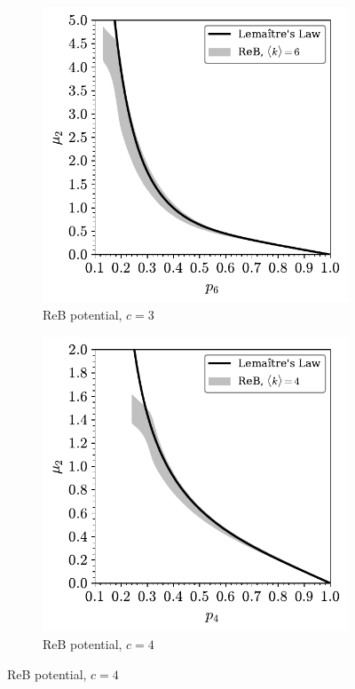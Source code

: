 \begin{figure}[bt]
     \vspace{2mm}
     \begin{subfigure}[b]{0.45\textwidth}
         \centering
         \includegraphics[width=\textwidth]{./figures/general_networks/lemaitre_6.pdf}
         \caption{ReB potential, $c=3$}
         \label{fig:lmgenb}
     \end{subfigure}
     \hfill
     \begin{subfigure}[b]{0.45\textwidth}
         \centering
         \includegraphics[width=\textwidth]{./figures/general_networks/lemaitre_4.pdf}
         \caption{ReB potential, $c=4$}
         \label{fig:lmgenc}
     \end{subfigure}
     \hfill
 

\end{figure}
